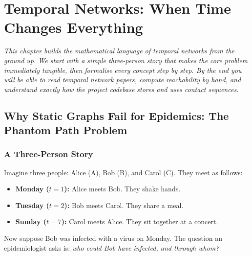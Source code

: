 \chapter{Temporal Networks: When Time Changes Everything}
\label{chap:temporal_networks}

\textit{This chapter builds the mathematical language of temporal networks from the ground up. We
start with a simple three-person story that makes the core problem immediately tangible, then
formalise every concept step by step. By the end you will be able to read temporal network
papers, compute reachability by hand, and understand exactly how the project codebase stores
and uses contact sequences.}

\section{Why Static Graphs Fail for Epidemics: The Phantom Path Problem}
\label{sec:phantom_paths}

\subsection{A Three-Person Story}

Imagine three people: Alice (A), Bob (B), and Carol (C). They meet as follows:

\begin{itemize}
    \item \textbf{Monday ($t = 1$):} Alice meets Bob. They shake hands.
    \item \textbf{Tuesday ($t = 2$):} Bob meets Carol. They share a meal.
    \item \textbf{Sunday ($t = 7$):} Carol meets Alice. They sit together at a concert.
\end{itemize}

Now suppose Bob was infected with a virus on Monday. The question an epidemiologist asks is:
\textit{who could Bob have infected, and through whom?}

